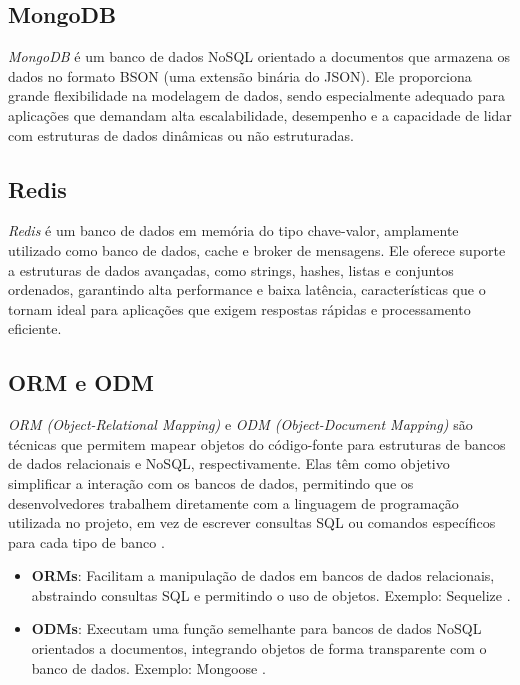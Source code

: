 \subsection{MongoDB}

\emph{MongoDB} é um banco de dados NoSQL orientado a documentos que armazena os dados no formato BSON (uma extensão binária do JSON). Ele proporciona grande flexibilidade na modelagem de dados, sendo especialmente adequado para aplicações que demandam alta escalabilidade, desempenho e a capacidade de lidar com estruturas de dados dinâmicas ou não estruturadas.

\subsection{Redis}

\emph{Redis} é um banco de dados em memória do tipo chave-valor, amplamente utilizado como banco de dados, cache e broker de mensagens. Ele oferece suporte a estruturas de dados avançadas, como strings, hashes, listas e conjuntos ordenados, garantindo alta performance e baixa latência, características que o tornam ideal para aplicações que exigem respostas rápidas e processamento eficiente.


\subsection{ORM e ODM}

\emph{ORM (Object-Relational Mapping)} e \emph{ODM (Object-Document Mapping)} são técnicas que permitem mapear objetos do código-fonte para estruturas de bancos de dados relacionais e NoSQL, respectivamente. Elas têm como objetivo simplificar a interação com os bancos de dados, permitindo que os desenvolvedores trabalhem diretamente com a linguagem de programação utilizada no projeto, em vez de escrever consultas SQL ou comandos específicos para cada tipo de banco \cite{orm-vs-odm}.

\begin{itemize}
    \item \textbf{ORMs}: Facilitam a manipulação de dados em bancos de dados relacionais, abstraindo consultas SQL e permitindo o uso de objetos. Exemplo: Sequelize \cite{sequelize}.
    \item \textbf{ODMs}: Executam uma função semelhante para bancos de dados NoSQL orientados a documentos, integrando objetos de forma transparente com o banco de dados. Exemplo: Mongoose \cite{mongoose}.
\end{itemize}

